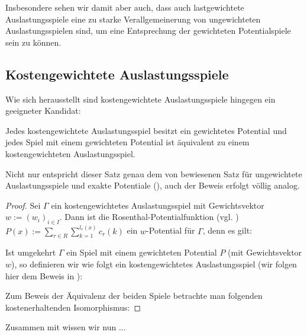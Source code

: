 \begin{kor}
\end{kor}

Insbesondere sehen wir damit aber auch, dass auch lastgewichtete Auslastungsspiele eine zu starke Verallgemeinerung von ungewichteten Auslastungsspielen sind, um eine Entsprechung der gewichteten Potentialspiele sein zu können.


\subsection{Kostengewichtete Auslastungsspiele}

Wie sich herausstellt sind kostengewichtete Auslastungsspiele hingegen ein geeigneter Kandidat:

\begin{satz}
	Jedes kostengewichtete Auslastungsspiel besitzt ein gewichtetes Potential und jedes Spiel mit einem gewichteten Potential ist äquivalent zu einem kostengewichteten Auslastungsspiel.
\end{satz}

Nicht nur entspricht dieser Satz genau dem von \citeauthor{MonShap} bewiesenen Satz für ungewichtete Auslastungsspiele und exakte Potentiale (), auch der Beweis erfolgt völlig analog. 

\begin{proof}
	Sei $\Gamma$ ein kostengewichtetes Auslastungsspiel mit Gewichtsvektor $w := (w_i)_{i\in I}$. Dann ist die Rosenthal-Potentialfunktion (vgl. \cite{RosenthalPotential}) $P(x) := \sum_{r \in R}\sum_{k=1}^{l_r(x)}c_r(k)$ ein $w$-Potential für $\Gamma$, denn es gilt:
	
		
	Ist umgekehrt $\Gamma$ ein Spiel mit einem gewichteten Potential $P$ (mit Gewichtsvektor $w$), so definieren wir wie folgt ein kostengewichtetes Auslastungsspiel (wir folgen hier dem Beweis in \cite[Theorem 1]{MultiPotGames}):
	
	
	Zum Beweis der Äquivalenz der beiden Spiele betrachte man folgenden kostenerhaltenden Isomorphismus:
	
\end{proof}

Zusammen mit  wissen wir nun ...



